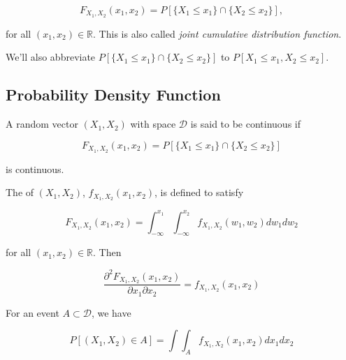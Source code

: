 \documentclass{article}
\begin{document}
            \begin{equation*}
                  F_{X_{1}, X_{2}} (x_{1}, x_{2}) = P [  \{ X_{1} \leq x_{1} \}
                  \cap  \{ X_{2} \leq x_{2} \}],
            \end{equation*}

            for all $ (x_{1}, x_{2}) \in \mathbb{R} $. This is also called
            \textit{joint cumulative distribution function}.

            We'll also abbreviate $
            P [  \{ X_{1} \leq x_{1} \} \cap  \{ X_{2} \leq x_{2} \}] $ to
            $ P [ X_{1} \leq x_{1}, X_{2} \leq x_{2} ] $.

        \subsection{Probability Density Function}

            A random vector $ (X_{1}, X_{2}) $ with space $ \mathcal{D} $ is
            said to be continuous if

            \begin{equation*}
                F_{X_{1}, X_{2}}(x_{1}, x_{2}) = P [  \{ X_{1} \leq x_{1} \}
                  \cap  \{ X_{2} \leq x_{2} \} ]
            \end{equation*}

            is continuous.

            The  of $ (X_{1}, X_{2})
            $, $ f_{X_{1}, X_{2}}(x_{1}, x_{2}) $, is defined to satisfy

            \begin{equation*}
                 F_{X_{1}, X_{2}} (x_{1}, x_{2}) = \int_{-\infty}^{x_{1}}
                     \int_{-\infty}^{x_{2}} f_{X_{1}, X_{2}} (w_{1}, w_{2}) d w_{1} d w_{2}
            \end{equation*}

            for all $ (x_{1}, x_{2}) \in \mathbb{R} $. Then

            \begin{equation*}
                 \frac{\partial^{2} F_{X_{1}, X_{2}} (x_{1}, x_{2})}{\partial
                     x_{1} \partial x_{2}} = f_{X_{1}, X_{2}} (x_{1}, x_{2})
            \end{equation*}

            For an event $ A \subset \mathcal{D} $, we have

            \begin{equation*}
                 P [ (X_{1}, X_{2}) \in A ] = \int \int_{A} f_{X_{1}, X_{2}}
                     (x_{1}, x_{2}) d x_{1} d x_{2}
            \end{equation*}
\end{document}
